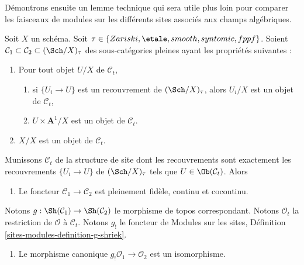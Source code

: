 \noindent
D\'emontrons ensuite un lemme technique qui sera utile plus loin pour comparer
les faisceaux de modules sur les diff\'erents sites associ\'es aux champs alg\'ebriques.

\begin{lemma}
\label{lemma-compare-structure-sheaves}
Soit $X$ un sch\'ema. Soit
$\tau \in \{Zariski, \etale, smooth, syntomic, fppf\}$.
Soient $\mathcal{C}_1 \subset \mathcal{C}_2 \subset (\Sch/X)_\tau$ des sous-cat\'egories pleines
ayant les propri\'et\'es suivantes :
\begin{enumerate}
\item Pour tout objet $U/X$ de $\mathcal{C}_t$,
\begin{enumerate}
\item si $\{U_i \to U\}$ est un recouvrement de $(\Sch/X)_\tau$, alors
$U_i/X$ est un objet de $\mathcal{C}_t$,
\item $U \times \mathbf{A}^1/X$ est un objet de $\mathcal{C}_t$.
\end{enumerate}
\item $X/X$ est un objet de $\mathcal{C}_t$.
\end{enumerate}
Munissons $\mathcal{C}_t$ de la structure de site dont les recouvrements sont
exactement les recouvrements $\{U_i \to U\}$ de $(\Sch/X)_\tau$ tels que
$U \in \Ob(\mathcal{C}_t)$. Alors
\begin{enumerate}
\item[(a)] Le foncteur $\mathcal{C}_1 \to \mathcal{C}_2$
est pleinement fid\`ele, continu et cocontinu.
\end{enumerate}
Notons $g : \Sh(\mathcal{C}_1) \to \Sh(\mathcal{C}_2)$ le
morphisme de topos correspondant. Notons $\mathcal{O}_t$ la restriction de $\mathcal{O}$
\`a $\mathcal{C}_t$. Notons $g_!$ le foncteur de
Modules sur les sites, D\'efinition \ref{sites-modules-definition-g-shriek}.
\begin{enumerate}
\item[(b)] Le morphisme canonique $g_!\mathcal{O}_1 \to \mathcal{O}_2$
est un isomorphisme.
\end{enumerate}
\end{lemma}

